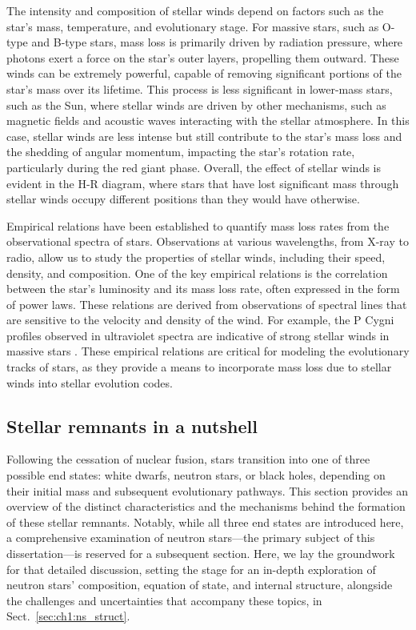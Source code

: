 \documentclass[main.tex]{subfiles}
\begin{document}
    The intensity and composition of stellar winds depend on factors such as the star's mass, temperature, and evolutionary stage. For massive stars, such as O-type and B-type stars, mass loss is primarily driven by radiation pressure, where photons exert a force on the star's outer layers, propelling them outward. These winds can be extremely powerful, capable of removing significant portions of the star's mass over its lifetime.
    This process is less significant in lower-mass stars, such as the Sun, where stellar winds are driven by other mechanisms, such as magnetic fields and acoustic waves interacting with the stellar atmosphere. In this case, stellar winds are less intense but still contribute to the star's mass loss and the shedding of angular momentum, impacting the star's rotation rate, particularly during the red giant phase. Overall, the effect of stellar winds is evident in the H-R diagram, where stars that have lost significant mass through stellar winds occupy different positions than they would have otherwise.

    Empirical relations have been established to quantify mass loss rates from the observational spectra of stars. Observations at various wavelengths, from X-ray to radio, allow us to study the properties of stellar winds, including their speed, density, and composition. One of the key empirical relations is the correlation between the star's luminosity and its mass loss rate, often expressed in the form of power laws. These relations are derived from observations of spectral lines that are sensitive to the velocity and density of the wind. For example, the P Cygni profiles observed in ultraviolet spectra are indicative of strong stellar winds in massive stars \citep[e.g.,][]{israelian:ssr99}. These empirical relations are critical for modeling the evolutionary tracks of stars, as they provide a means to incorporate mass loss due to stellar winds into stellar evolution codes.

    \subsection{Stellar remnants in a nutshell}\label{sec:ch1:remnants}
    Following the cessation of nuclear fusion, stars transition into one of three possible end states: white dwarfs, neutron stars, or black holes, depending on their initial mass and subsequent evolutionary pathways. This section provides an overview of the distinct characteristics and the mechanisms behind the formation of these stellar remnants. Notably, while all three end states are introduced here, a comprehensive examination of neutron stars---the primary subject of this dissertation---is reserved for a subsequent section. Here, we lay the groundwork for that detailed discussion, setting the stage for an in-depth exploration of neutron stars' composition, equation of state, and internal structure, alongside the challenges and uncertainties that accompany these topics, in Sect.~\ref{sec:ch1:ns_struct}.
    
\end{document}

